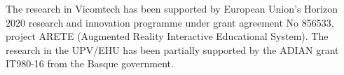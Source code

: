 \begin{acknowledgements}
The research in Vicomtech has been supported by European Union’s Horizon 2020 research and innovation programme under grant agreement No 856533, project ARETE (Augmented Reality Interactive Educational System).
The research in the UPV/EHU has been partially supported by the ADIAN grant IT980-16 from the Basque government.
\end{acknowledgements}